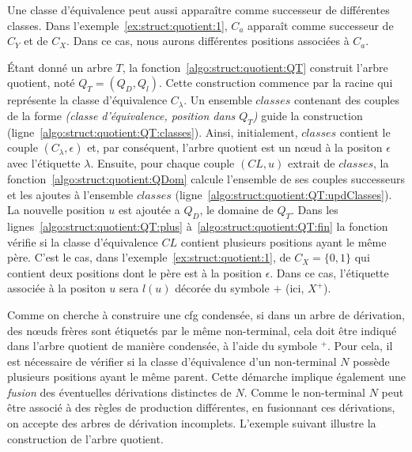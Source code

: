 \begin{remark}
    Une classe d'équivalence peut aussi apparaître comme successeur de différentes classes.
    Dans l'exemple~\ref{ex:struct:quotient:1}, $C_a$ apparaît comme successeur de $C_Y$ et de $C_X$.
    Dans ce cas, nous aurons différentes positions associées à $C_a$.
\end{remark}

Étant donné un arbre $T$, la fonction~\ref{algo:struct:quotient:QT} construit l'arbre quotient, noté $Q_T = (Q_D, Q_l)$.
Cette construction commence par la racine qui représente la classe d'équivalence $C_{\lambda}$.
Un ensemble $classes$ contenant des couples de la forme \textit{(classe d'équivalence, position dans $Q_T$)} guide la construction (ligne~\ref{algo:struct:quotient:QT:classes}).
Ainsi, initialement, $classes$ contient le couple $(C_{\lambda}, \epsilon)$ et, par conséquent, l'arbre quotient est un nœud à la positon $\epsilon$ avec l'étiquette $\lambda$.
Ensuite, pour chaque couple $(CL, u)$ extrait de $classes$, la fonction~\ref{algo:struct:quotient:QDom} calcule l'ensemble de ses couples successeurs et les ajoutes à l'ensemble $classes$ (ligne~\ref{algo:struct:quotient:QT:updClasses}).
La nouvelle position $u$ est ajoutée a $Q_D$, le domaine de $Q_T$.
Dans les lignes~\ref{algo:struct:quotient:QT:plus} à~\ref{algo:struct:quotient:QT:fin} la fonction vérifie si la classe d'équivalence $CL$ contient plusieurs positions ayant le même père.
C'est le cas, dans l'exemple~\ref{ex:struct:quotient:1}, de $C_X=\{0, 1\}$ qui contient deux positions dont le père est à la position $\epsilon$.
Dans ce cas, l'étiquette associée à la positon $u$ sera $l(u)$ décorée du symbole $+$ (ici, $X^+$).

Comme on cherche à construire une \gls{cfg} condensée, si dans un arbre de dérivation, des nœuds frères sont étiquetés par le même non-terminal, cela doit être indiqué dans l'arbre quotient de manière condensée, à l'aide du symbole ${}^+$.
Pour cela, il est nécessaire de vérifier si la classe d'équivalence d'un non-terminal $N$ possède plusieurs positions ayant le même parent.
Cette démarche implique également une \textit{fusion} des éventuelles dérivations distinctes de $N$.
Comme le non-terminal $N$ peut être associé à des règles de production différentes, en fusionnant ces dérivations, on accepte des arbres de dérivation incomplets.
L'exemple suivant illustre la construction de l'arbre quotient.

